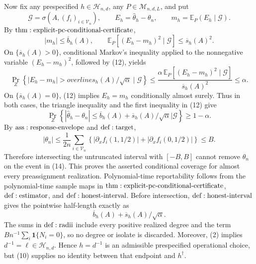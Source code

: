 Now fix any prespecified \(h\in\mathcal H_{n,d}\), any \(P\in\mathcal M_{n,d,L}\), and put
\[
 \mathcal G=\sigma\!\left(A,(f_i)_{i\in\mathcal V_n}\right),
 \qquad E_h=\widehat\theta_h-\theta_n,
 \qquad m_h=\mathbb E_P(E_h\mid\mathcal G).
\tag{11}
\]
By \({\rm thm:explicit\text{-}pc\text{-}conditional\text{-}certificate}\),
\[
 |m_h|\leq\overline b_h(A),
 \qquad
 \mathbb E_P\!\left[(E_h-m_h)^2\mid\mathcal G\right]
 \leq\overline s_h(A)^2.
\tag{12}
\]
On \(\{\overline s_h(A)>0\}\), conditional Markov's inequality applied to the nonnegative variable \((E_h-m_h)^2\), followed by (12), yields
\[
 \Pr_Z\!\left\{|E_h-m_h|>overline s_h(A)/\sqrt\alpha\mid\mathcal G\right\}
 \leq
 \frac{\alpha\,\mathbb E_P[(E_h-m_h)^2\mid\mathcal G]}
      {\overline s_h(A)^2}
 \leq\alpha.
\tag{13}
\]
On \(\{\overline s_h(A)=0\}\), (12) implies \(E_h=m_h\) conditionally almost surely.  Thus in both cases, the triangle inequality and the first inequality in (12) give
\[
 \Pr_Z\!\left\{
 |\widehat\theta_h-\theta_n|
 \leq\overline b_h(A)+\overline s_h(A)/\sqrt\alpha
 \mathrel{\Big|}\mathcal G\right\}\geq1-\alpha.
\tag{14}
\]
By \({\rm ass:response\text{-}envelope}\) and \({\rm def:target}\),
\[
 |\theta_n|
 \leq\frac1{2n}\sum_{i\in\mathcal V_n}
 \left\{|\partial_xf_i(1,1/2)|+|\partial_xf_i(0,1/2)|\right\}
 \leq B.
\tag{15}
\]
Therefore intersecting the untruncated interval with \([-B,B]\) cannot remove \(\theta_n\) on the event in (14).  This proves the asserted conditional coverage for almost every preassignment realization.  Polynomial-time reportability follows from the polynomial-time sample maps in \({\rm thm:explicit\text{-}pc\text{-}conditional\text{-}certificate}\), \({\rm def:estimator}\), and \({\rm def:honest\text{-}interval}\).  Before intersection, \({\rm def:honest\text{-}interval}\) gives the pointwise half-length exactly as
\[
 \overline b_h(A)+\overline s_h(A)/\sqrt\alpha.
\tag{16}
\]
The sums in \({\rm def:radii}\) include every positive realized degree and the term \(Bn^{-1}\sum_i\mathbf1\{N_i=0\}\), so no degree or isolate is discarded.  Moreover, (2) implies \(d^{-1}=\ell\in\mathcal H_{n,d}\).  Hence \(h=d^{-1}\) is an admissible prespecified operational choice, but (10) supplies no identity between that endpoint and \(h^\dagger\).

